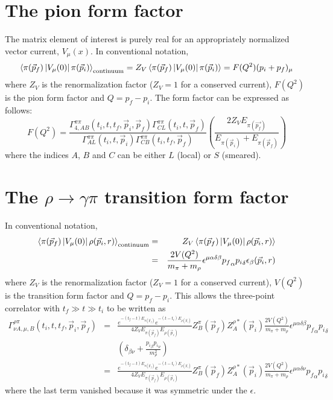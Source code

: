 \documentclass[12pt]{article}
\begin{document}
\section{The pion form factor}

The matrix element of interest is purely real for an appropriately
normalized vector current, $V_\mu(x)$.  In conventional notation,
\begin{equation}
\left<\pi(\vec{p}_f)\left|V_\mu(0)\right|\pi(\vec{p}_i)\right>_{\rm continuum}
= Z_V\left<\pi(\vec{p}_f)\left|V_\mu(0)\right|\pi(\vec{p}_i)\right>
= F(Q^2)(p_i+p_f)_\mu
\end{equation}
where $Z_V$ is the renormalization factor ($Z_V=1$ for a conserved current),
$F(Q^2)$ is the pion form factor and $Q=p_f-p_i$.
The form factor can be expressed as follows:
\begin{equation}
F(Q^2) = \frac{\Gamma^{\pi\pi}_{4,AB}(t_i,t,t_f,\vec{p}_i,\vec{p}_f)
   \Gamma^{\pi\pi}_{CL}(t_i,t,\vec{p}_f)}
  {\Gamma^{\pi\pi}_{AL}(t_i,t,\vec{p}_i)
   \Gamma^{\pi\pi}_{CB}(t_i,t_f,\vec{p}_f)}
   \left(
   \frac{2Z_VE_{\pi(\vec{p_f})}}{E_{\pi(\vec{p}_i)}+E_{\pi(\vec{p}_f)}}
   \right)
\end{equation}
where the indices $A$, $B$ and $C$ can be either $L$ (local)
or $S$ (smeared).



\section{The $\rho\rightarrow\gamma\pi$ transition form factor}

In conventional notation,
\begin{eqnarray*}
\left<\pi(\vec{p}_f)\left|V_\mu(0)\right|\rho(\vec{p}_i,r)\right>_{\rm continuum}
&=& Z_V\left<\pi(\vec{p}_f)\left|V_\mu(0)\right|\rho(\vec{p}_i,r)\right> \\
&=& \frac{2 V(Q^2)}{m_\pi+m_\rho}\epsilon^{\mu\alpha\delta\beta}{p_f}_\alpha 
    {p_i}_\delta\epsilon_\beta(\vec{p}_i,r)
\end{eqnarray*}
where $Z_V$ is the renormalization factor ($Z_V=1$ for a conserved current),
$V(Q^2)$ is the transition form factor and $Q=p_f-p_i$.
This allows the three-point correlator with $t_f\gg t\gg t_i$ to be written as
\begin{eqnarray}
\Gamma^{\rho\pi}_{\nu A,\mu,B}(t_i,t,t_f,\vec p_i,\vec p_f)
&=& \frac{e^{-(t_f-t)E_{\pi(\vec{p}_f)}}e^{-(t-t_i)E_{\rho(\vec{p}_i)}}}
   {4Z_V E_{\pi(\vec{p}_f)}E_{\rho(\vec{p}_i)}}
   Z_B^\pi(\vec p_f)Z_A^{\rho*}(\vec p_i)\frac{2V(Q^2)}{m_\pi
     +m_\rho}\epsilon^{\mu\alpha\delta\beta}{p_f}_\alpha{p_i}_\delta
     \nonumber \\ && \left(
     \delta_{\beta\nu}+\frac{{p_i}_\beta{p_i}_\nu}{m_\rho^2}\right) \nonumber\\
&=& \frac{e^{-(t_f-t)E_{\pi(\vec{p}_f)}}e^{-(t-t_i)E_{\rho(\vec{p}_i)}}}
   {4Z_V E_{\pi(\vec{p}_f)}E_{\rho(\vec{p}_i)}}
   Z_B^\pi(\vec p_f)Z_A^{\rho*}(\vec p_i)\frac{2V(Q^2)}{m_\pi
     +m_\rho}\epsilon^{\mu\alpha\delta\nu}{p_f}_\alpha{p_i}_\delta \nonumber
\end{eqnarray}
where the last term vanished because it was symmetric under the $\epsilon$.
\vspace{5mm}
\end{document}
